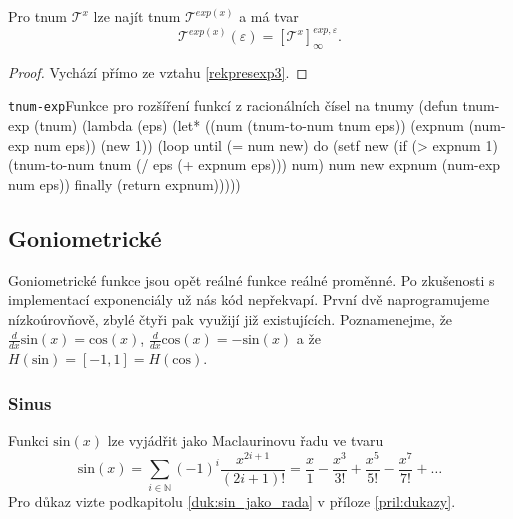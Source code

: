 \begin{consequence}\label{dusl:expotnumu}
Pro tnum $\mathcal{T}^x$ lze najít tnum $\mathcal{T}^{exp(x)}$ a má tvar
\begin{equation}
\mathcal{T}^{exp(x)}(\varepsilon)=\left[\mathcal{T}^x\right]_\infty^{exp,\varepsilon}.
\end{equation}
\begin{proof}
Vychází přímo ze vztahu \ref{rekpresexp3}.
\end{proof}
\end{consequence}

\begin{lispcode}{\texttt{tnum-exp}}{Funkce pro rozšíření funkcí z racionálních čísel na tnumy}
(\textcolor{funkcionalni}{defun} \textcolor{pojmenovan}{tnum-exp} (tnum)
  (\textcolor{funkcionalni}{lambda} (eps)
    (\textcolor{vedlejsi}{let*} ((num (\textcolor{moje}{tnum-to-num} tnum eps))
          (expnum (\textcolor{moje}{num-exp} num eps))
          (new 1))
      (\textcolor{funkcionalni}{loop} 
        \textcolor{obarvi}{until} (\textcolor{matematicke}{=} num new)
        \textcolor{obarvi}{do} (\textcolor{vedlejsi}{setf} new (\textcolor{funkcionalni}{if} (\textcolor{matematicke}{>} expnum 1)
              (\textcolor{moje}{tnum-to-num} tnum (\textcolor{matematicke}{/} eps (\textcolor{matematicke}{+} expnum eps)))
              num)
          num new
          expnum (\textcolor{moje}{num-exp} num eps))
        \textcolor{obarvi}{finally} (\textcolor{funkcionalni}{return} expnum)))))
\end{lispcode}

\subsection{Goniometrické}
Goniometrické funkce jsou opět reálné funkce reálné proměnné. Po zkušenosti s implementací exponenciály už nás kód nepřekvapí. První dvě naprogramujeme nízkoúrovňově, zbylé čtyři pak využijí již existujících. Poznamenejme, že $\frac{d}{dx}\mathrm{sin}(x) = \mathrm{cos}(x)$, $\frac{d}{dx}\mathrm{cos}(x) = -\mathrm{sin}(x)$ a že $H(\mathrm{sin}) = [-1,1] = H(\mathrm{cos})$.

\subsubsection{Sinus}
\begin{fact}\label{vet:sin_jako_rada}
Funkci $\mathrm{sin}(x)$ lze vyjádřit jako Maclaurinovu řadu ve tvaru
\begin{equation}
\mathrm{sin}(x) =\sum_{i \in \mathbb{N}} (-1)^i \frac{x^{2i+1}}{(2i+1)!} =\frac{x}{1} - \frac{x^3}{3!} + \frac{x^5}{5!} - \frac{x^7}{7!} + \ldots
\end{equation}
Pro důkaz vizte podkapitolu \ref{duk:sin_jako_rada} v příloze \ref{pril:dukazy}.
\end{fact}

